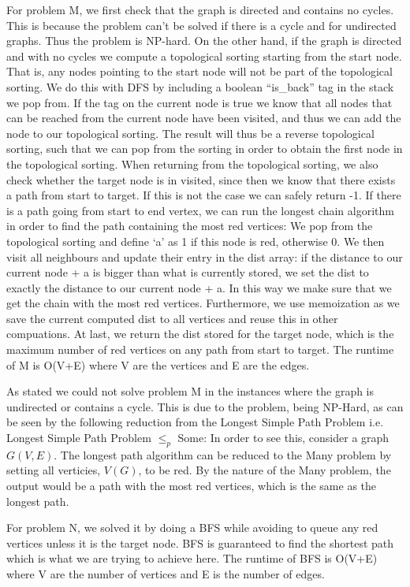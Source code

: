 \documentclass[a4paper]{article}
\begin{document}
For problem M, we first check that the graph is directed and contains no cycles. This is because the problem can’t be solved if there is a cycle and for undirected graphs. Thus the problem is NP-hard. On the other hand, if the graph is directed and with no cycles we compute a topological sorting starting from the start node. That is, any nodes pointing to the start node will not
 be part of the topological sorting. We do this with DFS by including a boolean “is\_back” tag in the stack we pop from. If the tag on the current node is true we know that all nodes that can be reached from the current node have been visited, and thus we can add the node to our topological sorting. The result will thus be a reverse topological sorting, 
such that we can pop from the sorting in order to obtain the first node in the topological sorting. When returning from the topological sorting, we also check whether the target node is in visited, since then we know that there exists a path from start to target. If this is not the case we can safely return
 -1. If there is a path going from start to end vertex, we can run the longest chain algorithm in order to find the path containing the most red vertices: We pop from the topological sorting and define ‘a’ as 1 if this node is red, otherwise 0. We then visit all neighbours and update their entry in the dist array: if the distance to our current node + a is bigger
 than what is currently stored, we set the dist to exactly the distance to our current node + a. In this way we make sure that we get the chain with the most red vertices. Furthermore, we use memoization as we save the current computed dist to all vertices and reuse this in other compuations. At last, we return the dist stored for the target node, which is the maximum number of red vertices on any path from start to target. The runtime of M is O(V+E) where V are the vertices and E are the edges.
 
As stated we could not solve problem M in the instances where the graph is undirected or contains a cycle. This is due to the problem, being NP-Hard, as can be seen by the following reduction from the Longest Simple Path Problem i.e. Longest Simple Path Problem $\leq_p$ Some: In order to see this, consider a graph $G(V,E)$. The longest path algorithm can be reduced to the Many problem by setting all verticies, $V(G)$, to be red. By the nature of the Many problem, the output would be a path with the most red vertices, which is the same as the longest path. 

For problem N, we solved it by doing a BFS while avoiding to queue any red vertices unless it is the target node. BFS is guaranteed
to find the shortest path which is what we are trying to achieve here.
The runtime of BFS is O(V+E) where V are the number of vertices and E is the number of edges.
\end{document}
